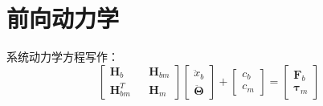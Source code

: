 \documentclass[UTF8]{ctexart}
\begin{document}
\section{前向动力学}
系统动力学方程写作：
\begin{equation}
	\left[\begin{matrix}
	\boldsymbol{H}_{b} && \boldsymbol{H}_{bm}\\
	\boldsymbol{H}_{bm}^{T} && \boldsymbol{H}_{m}
	\end{matrix}\right]\left[\begin{matrix}
	\ddot{x}_{b}\\
	\ddot{\boldsymbol{\Theta}}
	\end{matrix}\right]+\left[\begin{matrix}
	c_{b}\\
	c_{m}
	\end{matrix}\right]=\left[\begin{matrix}
	\boldsymbol{F}_{b}\\
	\boldsymbol{\tau}_{m}
	\end{matrix}\right]
	\label{forward-dyn}
\end{equation}
\end{document}
